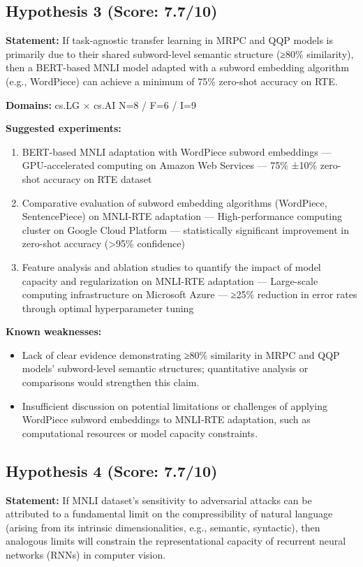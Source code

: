 \documentclass[12pt,a4paper]{article}
\begin{document}
\subsection*{Hypothesis 3 (Score: 7.7/10)}

\textbf{Statement:} If task-agnostic transfer learning in MRPC and QQP models is primarily due to their shared subword-level semantic structure (≥80\% similarity), then a BERT-based MNLI model adapted with a subword embedding algorithm (e.g., WordPiece) can achieve a minimum of 75\% zero-shot accuracy on RTE.

\noindent\textbf{Domains:} cs.LG $\times$ cs.AI
\hspace{1em} N=8 / F=6 / I=9

\textbf{Suggested experiments:}
\begin{enumerate}
  \item BERT-based MNLI adaptation with WordPiece subword embeddings — GPU-accelerated computing on Amazon Web Services — 75\% ±10\% zero-shot accuracy on RTE dataset
  \item Comparative evaluation of subword embedding algorithms (WordPiece, SentencePiece) on MNLI-RTE adaptation — High-performance computing cluster on Google Cloud Platform — statistically significant improvement in zero-shot accuracy (>95\% confidence)
  \item Feature analysis and ablation studies to quantify the impact of model capacity and regularization on MNLI-RTE adaptation — Large-scale computing infrastructure on Microsoft Azure —  ≥25\% reduction in error rates through optimal hyperparameter tuning
\end{enumerate}

\textbf{Known weaknesses:}
\begin{itemize}
  \item Lack of clear evidence demonstrating ≥80\% similarity in MRPC and QQP models' subword-level semantic structures; quantitative analysis or comparisons would strengthen this claim.
  \item Insufficient discussion on potential limitations or challenges of applying WordPiece subword embeddings to MNLI-RTE adaptation, such as computational resources or model capacity constraints.
\end{itemize}
\subsection*{Hypothesis 4 (Score: 7.7/10)}

\textbf{Statement:} If MNLI dataset's sensitivity to adversarial attacks can be attributed to a fundamental limit on the compressibility of natural language (arising from its intrinsic dimensionalities, e.g., semantic, syntactic), then analogous limits will constrain the representational capacity of recurrent neural networks (RNNs) in computer vision.
\end{document}
